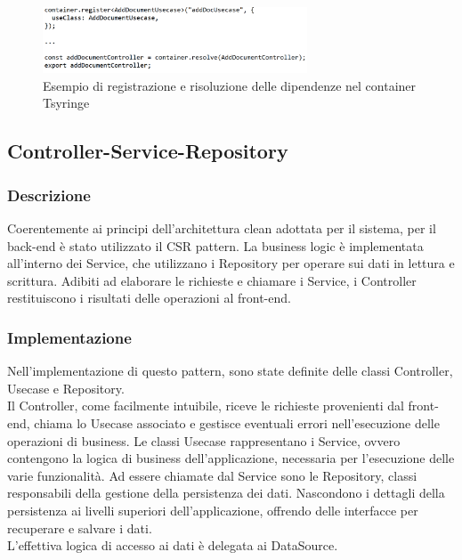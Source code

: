 \begin{figure}[h!]
    \centering  
    \includegraphics[width=0.7\textwidth]{DIcontainer.png}
    \caption{Esempio di registrazione e risoluzione delle dipendenze nel container Tsyringe}
\end{figure}

\newpage

\subsection{Controller-Service-Repository}
\subsubsection{Descrizione}
Coerentemente ai principi dell'architettura clean adottata per il sistema, per il back-end è stato utilizzato il CSR pattern. La business logic è implementata all'interno dei Service, che utilizzano i Repository per operare sui dati in lettura e scrittura. Adibiti ad elaborare le richieste e chiamare i Service, i Controller restituiscono i risultati delle operazioni al front-end.
\subsubsection{Implementazione}
Nell'implementazione di questo pattern, sono state definite delle classi Controller, Usecase e Repository.\\
Il Controller, come facilmente intuibile, riceve le richieste provenienti dal front-end, chiama lo Usecase associato e gestisce eventuali errori nell'esecuzione delle operazioni di business. Le classi Usecase rappresentano i Service, ovvero contengono la logica di business dell'applicazione, necessaria per l'esecuzione delle varie funzionalità. Ad essere chiamate dal Service sono le Repository, classi  responsabili della gestione della persistenza dei dati. Nascondono i dettagli della persistenza ai livelli superiori dell'applicazione, offrendo delle interfacce per recuperare e salvare i dati.
\\L'effettiva logica di accesso ai dati è delegata ai DataSource.

\newpage

